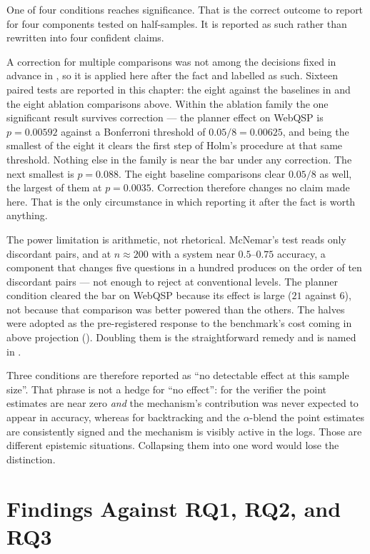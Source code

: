 One of four conditions reaches significance. That is the correct outcome to
report for four components tested on half-samples. It is
reported as such rather than rewritten into four confident claims.

A correction for multiple comparisons was not among the decisions fixed in
advance in , so it is applied here after the fact and
labelled as such. Sixteen paired tests are reported in this chapter: the eight
against the baselines in  and the eight ablation comparisons
above. Within the ablation family the one significant result survives correction
--- the planner effect on WebQSP is $p = 0.00592$ against a Bonferroni threshold
of $0.05/8 = 0.00625$, and being the smallest of the eight it clears the first
step of Holm's procedure at that same threshold. Nothing else in the family is
near the bar under any correction. The next smallest is $p = 0.088$. The eight
baseline comparisons clear $0.05/8$ as well, the largest of them at $p =
0.0035$. Correction therefore changes no claim made here. That is the only
circumstance in which reporting it after the fact is worth anything.

The power limitation is arithmetic, not rhetorical. McNemar's test reads only
discordant pairs, and at $n \approx 200$ with a system near $0.5$--$0.75$
accuracy, a component that changes five questions in a hundred produces on the
order of ten discordant pairs --- not enough to reject at conventional levels.
The planner condition cleared the bar on WebQSP because its effect is large
($21$ against $6$), not because that comparison was better powered than the
others. The halves were adopted as the pre-registered response to the
benchmark's cost coming in above projection ().
Doubling them is the straightforward remedy and is named in
.

Three conditions are therefore reported as ``no detectable effect at this sample
size''. That phrase is not a hedge for ``no effect'': for the verifier the point
estimates are near zero \emph{and} the mechanism's contribution was never
expected to appear in accuracy, whereas for backtracking and the $\alpha$-blend
the point estimates are consistently signed and the mechanism is visibly active
in the logs. Those are different epistemic situations. Collapsing them into
one word would lose the distinction.

\section{Findings Against RQ1, RQ2, and RQ3}\label{sec:findings}

